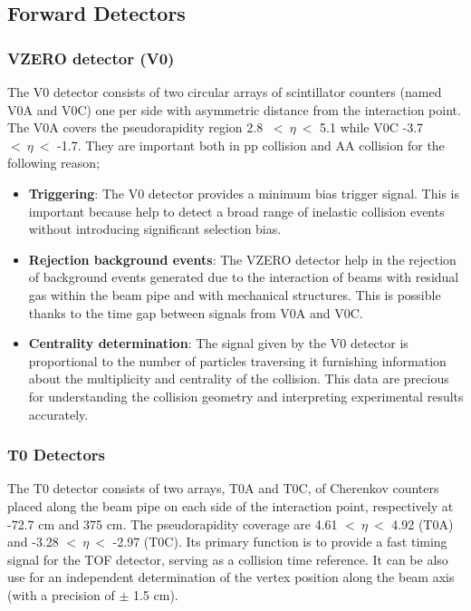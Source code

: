 \documentclass[12pt,a4paper]{book}
\begin{document}
	\subsection{Forward Detectors}
	\subsubsection{VZERO detector (V0)} 
	The V0 detector consists of two circular arrays of scintillator counters (named V0A and V0C) one per side with asymmetric distance from the interaction point. The V0A covers the pseudorapidity region 2.8 $\ <\ \eta \ <$ 5.1 while V0C -3.7 $<\ \eta \ <$ -1.7. They are important both in pp collision and AA collision for the following reason;
	\begin{itemize}
		\item \textbf{Triggering}: The V0 detector provides a minimum bias trigger signal. This is important because help to detect a broad range of inelastic collision events without introducing significant selection bias.
		\item \textbf{Rejection background events}: The VZERO detector help in the rejection of background events generated due to the interaction of beams with residual gas within the beam pipe and with mechanical structures. This is possible thanks to the time gap between signals from V0A and V0C.
		\item \textbf{Centrality determination}: The signal given by the V0 detector is proportional to
		the number of particles traversing it furnishing information about the multiplicity and centrality of the collision. This data are precious for understanding the collision geometry and interpreting experimental results accurately.
	\end{itemize}
	\cite{Padhan:2924203} \cite{amsdottorato9036}	
	
	\subsubsection{T0 Detectors}
	The T0 detector consists of two arrays, T0A and T0C, of Cherenkov counters placed along the beam pipe on each side of the interaction point, respectively at -72.7 cm and 375 cm.  The pseudorapidity coverage are	4.61 $<\ \eta\ <$ 4.92 (T0A) and -3.28 $<\ \eta\ <$ -2.97 (T0C). Its primary function is to provide a fast timing signal for the TOF detector, serving as a collision time reference. It can be also use for an independent determination of the vertex position along the beam axis (with a precision of $\pm$ 1.5 cm). \cite{Padhan:2924203} \cite{amsdottorato9036}	
	
\end{document}
